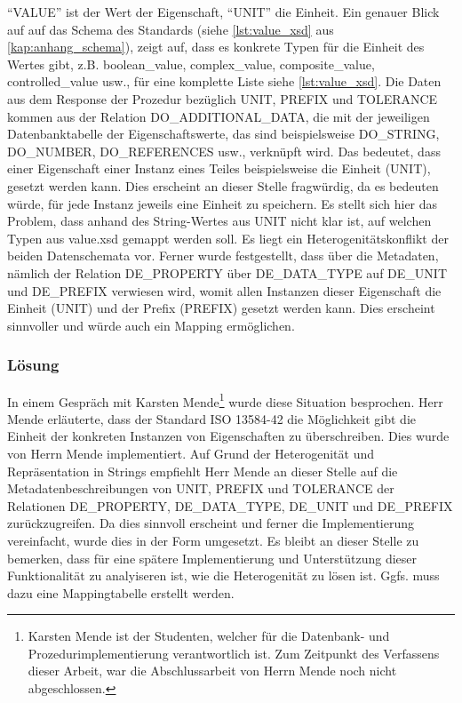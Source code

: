 \enquote{VALUE} ist der Wert der Eigenschaft, \enquote{UNIT} die Einheit. Ein genauer Blick auf auf das Schema des Standards (siehe \autoref{lst:value_xsd} aus \autoref{kap:anhang_schema}), zeigt auf, dass es konkrete Typen für die Einheit des Wertes gibt, z.B. boolean\_value, complex\_value, composite\_value, controlled\_value usw., für eine komplette Liste siehe \autoref{lst:value_xsd}. 
Die Daten aus dem Response der Prozedur bezüglich UNIT, PREFIX und TOLERANCE kommen aus der Relation DO\_ADDITIONAL\_DATA, die mit der jeweiligen Datenbanktabelle der Eigenschaftswerte, das sind beispielsweise DO\_STRING, DO\_NUMBER, DO\_REFERENCES usw., verknüpft wird. Das bedeutet, dass einer Eigenschaft einer Instanz eines Teiles beispielsweise die Einheit (UNIT), gesetzt werden kann. Dies erscheint an dieser Stelle fragwürdig, da es bedeuten würde, für jede Instanz jeweils eine Einheit zu speichern. 
Es stellt sich hier das Problem, dass anhand des String-Wertes aus UNIT nicht klar ist, auf welchen Typen aus value.xsd gemappt werden soll. Es liegt ein Heterogenitätskonflikt der beiden Datenschemata vor.  
Ferner wurde festgestellt, dass über die Metadaten, nämlich der Relation DE\_PROPERTY über DE\_DATA\_TYPE auf DE\_UNIT und DE\_PREFIX verwiesen wird, womit allen Instanzen dieser Eigenschaft die Einheit (UNIT) und der Prefix (PREFIX) gesetzt werden kann. Dies erscheint sinnvoller und würde auch ein Mapping ermöglichen. 

\subsubsection{Lösung}

In einem Gespräch mit Karsten Mende\footnote{Karsten Mende ist der Studenten, welcher für die Datenbank- und Prozedurimplementierung verantwortlich ist. Zum Zeitpunkt des Verfassens dieser Arbeit, war die Abschlussarbeit von Herrn Mende noch nicht abgeschlossen.} wurde diese Situation besprochen. Herr Mende erläuterte, dass der Standard ISO 13584-42 \citep[vgl.][]{iso13584-42} die Möglichkeit gibt die Einheit der konkreten Instanzen von Eigenschaften zu überschreiben. Dies wurde von Herrn Mende implementiert. Auf Grund der Heterogenität und Repräsentation in Strings empfiehlt Herr Mende an dieser Stelle auf die Metadatenbeschreibungen von UNIT, PREFIX und TOLERANCE der Relationen DE\_PROPERTY, DE\_DATA\_TYPE, DE\_UNIT und DE\_PREFIX zurückzugreifen. 
Da dies sinnvoll erscheint und ferner die Implementierung vereinfacht, wurde dies in der Form umgesetzt. Es bleibt an dieser Stelle zu bemerken, dass für eine spätere Implementierung und Unterstützung dieser Funktionalität zu analyiseren ist, wie die Heterogenität zu lösen ist. Ggfs. muss dazu eine Mappingtabelle erstellt werden.

